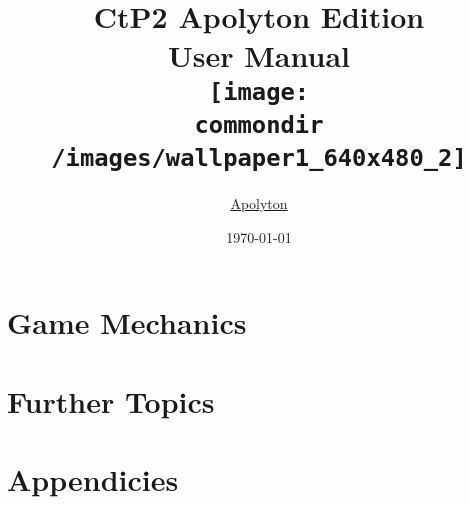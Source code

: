 \documentclass[a4paper,openany]{book}
\newcommand{\commondir}{../../common}
\newcommand{\apolytonlink}{%
	\href{http://apolyton.net/forums/forumdisplay.php?s=\&forumid=213}{Apolyton}%
}
\begin{document}
\title{CtP2 Apolyton Edition\\[5mm]
User Manual\\[20mm]
\texttt{[image: \\commondir /images/wallpaper1\_640x480\_2]}\\[5mm]}
\author{\apolytonlink}
\date{\today}
\maketitle
\thispagestyle{empty}
\tableofcontents
\newpage


\part{Game Mechanics}






\part{Further Topics}





\part{Appendicies}

\end{document}
